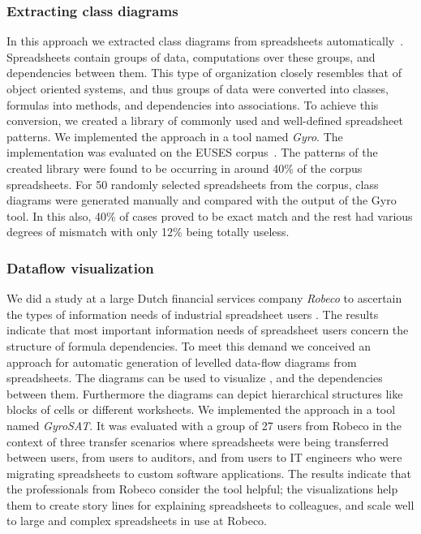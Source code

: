 \documentclass[conference]{IEEEtran}
\begin{document}
\subsubsection{Extracting class diagrams}
In this approach we extracted class diagrams from spreadsheets automatically~\cite{hermans_automatically_2010}. Spreadsheets contain groups of data, computations over these groups, and dependencies between them. This type of organization closely resembles that of object oriented systems, and thus groups of data were converted into classes, formulas into methods, and dependencies into associations. To achieve this conversion, we created a library of commonly used and well-defined spreadsheet patterns. We implemented the approach in a tool named \textit{Gyro}. The implementation was evaluated on the EUSES corpus~\cite{fisher_euses_2005}. The patterns of the created library were found to be occurring in around 40\% of the corpus spreadsheets. For 50 randomly selected spreadsheets from the corpus, class diagrams were generated manually and compared with the output of the Gyro tool. In this  also, 40\% of cases proved to be exact match and the rest had various degrees of mismatch with only 12\% being totally useless.

\subsubsection{Dataflow visualization}
We did a study at a large Dutch financial services company \textit{Robeco} to ascertain the types of information needs of industrial spreadsheet users \cite{hermans_supporting_2011}. The results indicate that most important information needs of spreadsheet users concern the structure of formula dependencies. To meet this demand we conceived an approach for automatic generation of levelled data-flow diagrams from spreadsheets. The diagrams can be used to visualize , and the dependencies between them. Furthermore the diagrams can depict hierarchical structures like blocks of cells or different worksheets. We implemented the approach in a tool named \textit{GyroSAT}. It was evaluated with a group of 27 users from Robeco in the context of three transfer scenarios where spreadsheets were being transferred between users, from users to auditors, and from users to IT engineers who were migrating spreadsheets to custom software applications. The results indicate that the professionals from Robeco consider the tool helpful; the visualizations help them to create story lines for explaining spreadsheets to colleagues, and  scale well to large and complex spreadsheets in use at Robeco.
\end{document}
